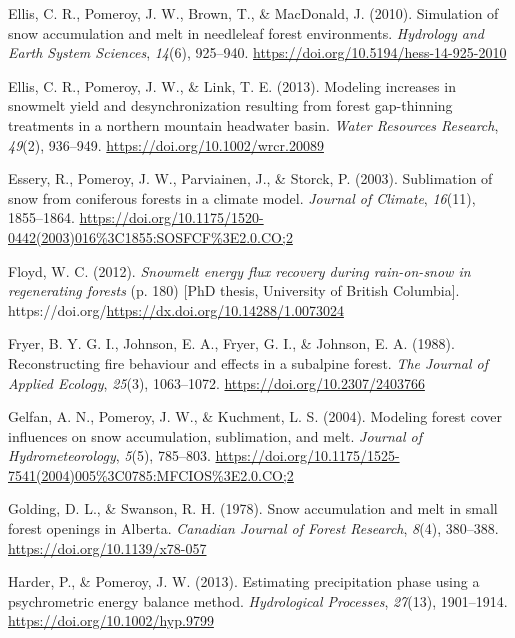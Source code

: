 \documentclass[
  letterpaper,
  DIV=11,
  numbers=noendperiod]{scrartcl}
\newlength{\cslhangindent}
\newenvironment{CSLReferences}[2] %
 {\begin{list}{}{%
  \setlength{\itemindent}{0pt}
  \setlength{\leftmargin}{0pt}
  \setlength{\parsep}{0pt}
  \ifodd #1
   \setlength{\leftmargin}{\cslhangindent}
   \setlength{\itemindent}{-1\cslhangindent}
  \fi
  \setlength{\itemsep}{#2\baselineskip}}}
 {\end{list}}
\begin{document}
\begin{CSLReferences}{1}{0}
Ellis, C. R., Pomeroy, J. W., Brown, T., \& MacDonald, J. (2010).
Simulation of snow accumulation and melt in needleleaf forest
environments. \emph{Hydrology and Earth System Sciences}, \emph{14}(6),
925--940. \url{https://doi.org/10.5194/hess-14-925-2010}

Ellis, C. R., Pomeroy, J. W., \& Link, T. E. (2013). Modeling increases
in snowmelt yield and desynchronization resulting from forest
gap-thinning treatments in a northern mountain headwater basin.
\emph{Water Resources Research}, \emph{49}(2), 936--949.
\url{https://doi.org/10.1002/wrcr.20089}

Essery, R., Pomeroy, J. W., Parviainen, J., \& Storck, P. (2003).
Sublimation of snow from coniferous forests in a climate model.
\emph{Journal of Climate}, \emph{16}(11), 1855--1864.
\url{https://doi.org/10.1175/1520-0442(2003)016\%3C1855:SOSFCF\%3E2.0.CO;2}

Floyd, W. C. (2012). \emph{Snowmelt energy flux recovery during
rain-on-snow in regenerating forests} (p. 180) {[}PhD thesis, University
of British Columbia{]}.
https://doi.org/\url{https://dx.doi.org/10.14288/1.0073024}

Fryer, B. Y. G. I., Johnson, E. A., Fryer, G. I., \& Johnson, E. A.
(1988). Reconstructing fire behaviour and effects in a subalpine forest.
\emph{The Journal of Applied Ecology}, \emph{25}(3), 1063--1072.
\url{https://doi.org/10.2307/2403766}

Gelfan, A. N., Pomeroy, J. W., \& Kuchment, L. S. (2004). Modeling
forest cover influences on snow accumulation, sublimation, and melt.
\emph{Journal of Hydrometeorology}, \emph{5}(5), 785--803.
\url{https://doi.org/10.1175/1525-7541(2004)005\%3C0785:MFCIOS\%3E2.0.CO;2}

Golding, D. L., \& Swanson, R. H. (1978). Snow accumulation and melt in
small forest openings in {Alberta}. \emph{Canadian Journal of Forest
Research}, \emph{8}(4), 380--388. \url{https://doi.org/10.1139/x78-057}

Harder, P., \& Pomeroy, J. W. (2013). Estimating precipitation phase
using a psychrometric energy balance method. \emph{Hydrological
Processes}, \emph{27}(13), 1901--1914.
\url{https://doi.org/10.1002/hyp.9799}


\end{CSLReferences}
\end{document}
